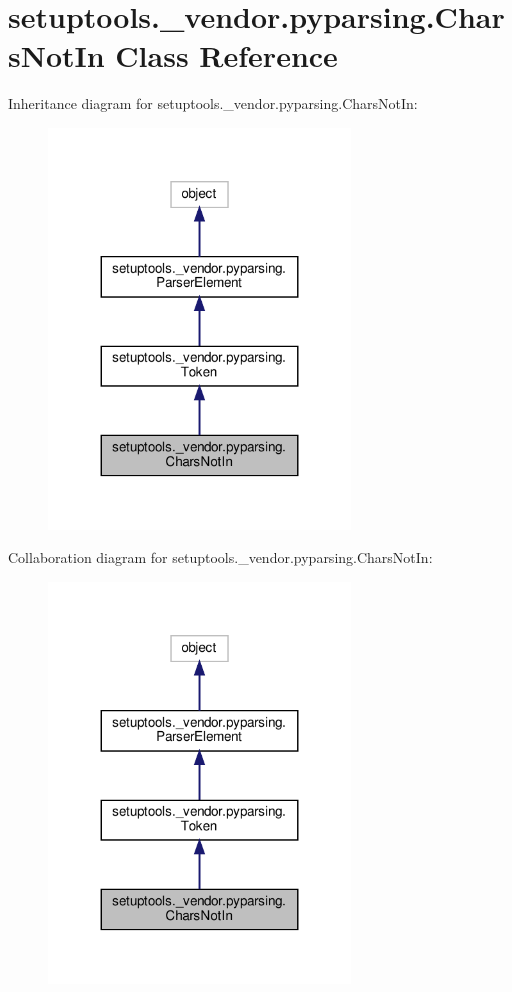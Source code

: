 \hypertarget{classsetuptools_1_1__vendor_1_1pyparsing_1_1CharsNotIn}{}\section{setuptools.\+\_\+vendor.\+pyparsing.\+Chars\+Not\+In Class Reference}
\label{classsetuptools_1_1__vendor_1_1pyparsing_1_1CharsNotIn}


Inheritance diagram for setuptools.\+\_\+vendor.\+pyparsing.\+Chars\+Not\+In\+:
\nopagebreak
\begin{figure}[H]
\begin{center}
\leavevmode
\includegraphics[width=227pt]{classsetuptools_1_1__vendor_1_1pyparsing_1_1CharsNotIn__inherit__graph}
\end{center}
\end{figure}


Collaboration diagram for setuptools.\+\_\+vendor.\+pyparsing.\+Chars\+Not\+In\+:
\nopagebreak
\begin{figure}[H]
\begin{center}
\leavevmode
\includegraphics[width=227pt]{classsetuptools_1_1__vendor_1_1pyparsing_1_1CharsNotIn__coll__graph}
\end{center}
\end{figure}
